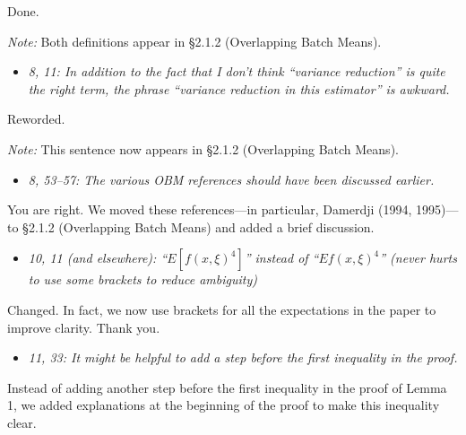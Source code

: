 \documentclass[11pt,notitlepage,onecolumn]{article}
\newcommand{\noi}{\noindent}
\begin{document}
\noi
Done. 
\smallskip  

\noi 
{\it Note:} Both definitions appear in \S 2.1.2 (Overlapping Batch Means).
\medskip 



\begin{itemize}
\item[] \textit{8, 11: In addition to the fact that I don't think ``variance reduction'' is quite the right term, the phrase ``variance reduction in this estimator'' is awkward.}
\end{itemize}

\noi
Reworded.\smallskip 

\noi 
{\it Note:} This sentence now appears in \S 2.1.2 (Overlapping Batch Means). 
\medskip 



\begin{itemize}
\item[] \textit{8, 53--57: The various OBM references should have been discussed earlier.}
\end{itemize}

\noi
You are right. 
We moved these references---in particular, Damerdji (1994, 1995)---to \S 2.1.2 (Overlapping Batch Means) and added a brief discussion.  
\medskip 



\begin{itemize}
\item[] \textit{10, 11 (and elsewhere): ``$E[f(x, \xi)^4]$'' instead of ``$Ef(x, \xi)^4$'' (never hurts to use some brackets to reduce ambiguity)}
\end{itemize}

\noi
Changed.
In fact, we now use brackets for all the expectations in the paper to improve clarity. 
Thank you.
\medskip 



\begin{itemize}
\item[] \textit{11, 33: It might be helpful to add a step before the first inequality in the proof.}
\end{itemize}

\noi
Instead of adding another step before the first inequality in the proof of Lemma 1, we added explanations at the beginning of the proof to make this inequality clear.   
\medskip 
\end{document}
